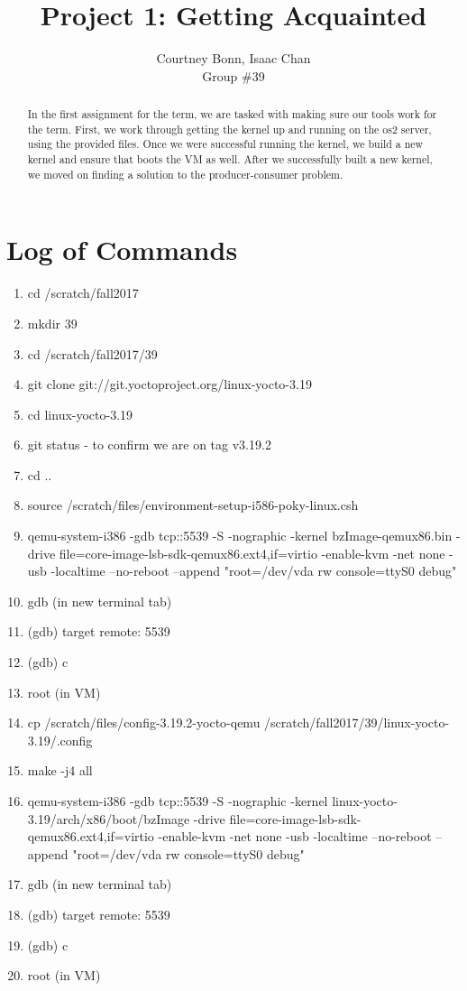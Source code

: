 \documentclass[letterpaper,10pt,draftclsnofoot,onecolumn,titlepage]{IEEEtran}
\def\name{Courtney Bonn, Isaac Chan}
\def\grp{Group \#39}
\begin{document}
\title{Project 1: Getting Acquainted}
\author{\name \\ \grp}

\maketitle

\begin{abstract}
In the first assignment for the term, we are tasked with making sure our tools work for the term. First, we work through getting the kernel up and running on the os2 server, using the provided files. Once we were successful running the kernel, we build a new kernel and ensure that boots the VM as well. After we successfully built a new kernel, we moved on finding a solution to the producer-consumer problem.  
\end{abstract}

\clearpage



\section{Log of Commands}
\begin{enumerate}
\item cd /scratch/fall2017
\item mkdir 39
\item cd /scratch/fall2017/39
\item git clone git://git.yoctoproject.org/linux-yocto-3.19
\item cd linux-yocto-3.19
\item git status - to confirm we are on tag v3.19.2
\item cd ..
\item source /scratch/files/environment-setup-i586-poky-linux.csh
\item qemu-system-i386 -gdb tcp::5539 -S -nographic -kernel bzImage-qemux86.bin -drive file=core-image-lsb-sdk-qemux86.ext4,if=virtio -enable-kvm -net none -usb -localtime --no-reboot --append "root=/dev/vda rw console=ttyS0 debug"
\item gdb (in new terminal tab)
\item (gdb) target remote: 5539
\item (gdb) c
\item root (in VM)
\item cp /scratch/files/config-3.19.2-yocto-qemu /scratch/fall2017/39/linux-yocto-3.19/.config
\item make -j4 all
\item qemu-system-i386 -gdb tcp::5539 -S -nographic -kernel linux-yocto-3.19/arch/x86/boot/bzImage -drive file=core-image-lsb-sdk-qemux86.ext4,if=virtio -enable-kvm -net none -usb -localtime --no-reboot --append "root=/dev/vda rw console=ttyS0 debug"
\item gdb (in new terminal tab)
\item (gdb) target remote: 5539
\item (gdb) c
\item root (in VM)
\end{enumerate}
\end{document}
